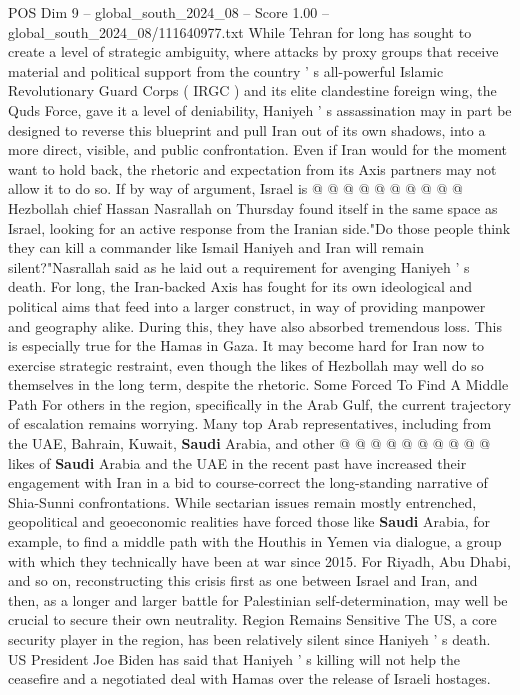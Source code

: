 \begin{textsample}{POS Dim 9 – global\_south\_2024\_08 – Score 1.00 – global\_south\_2024\_08/111640977.txt}
While Tehran for long has sought to create a level of strategic ambiguity, where attacks by proxy groups that receive material and political support from the country ' s all-powerful Islamic Revolutionary Guard Corps ( IRGC ) and its elite clandestine foreign wing, the Quds Force, gave it a level of deniability, Haniyeh ' s assassination may in part be designed to reverse this blueprint and pull Iran out of its own shadows, into a more direct, visible, and public confrontation.
Even if Iran would for the moment want to hold back, the rhetoric and expectation from its Axis partners may not allow it to do so.
If by way of argument, Israel is @ @ @ @ @ @ @ @ @ @ Hezbollah chief Hassan Nasrallah on Thursday found itself in the same space as Israel, looking for an active response from the Iranian side."Do those people think they can kill a commander like Ismail Haniyeh and Iran will remain silent?"Nasrallah said as he laid out a requirement for avenging Haniyeh ' s death.
For long, the Iran-backed Axis has fought for its own ideological and political aims that feed into a larger construct, in way of providing manpower and geography alike.
During this, they have also absorbed tremendous loss.
This is especially true for the Hamas in Gaza.
It may become hard for Iran now to exercise strategic restraint, even though the likes of Hezbollah may well do so themselves in the long term, despite the rhetoric.
Some Forced To Find A Middle Path For others in the region, specifically in the Arab Gulf, the current trajectory of escalation remains worrying.
Many top Arab representatives, including from the UAE, Bahrain, Kuwait, \textbf{Saudi} Arabia, and other @ @ @ @ @ @ @ @ @ @ likes of \textbf{Saudi} Arabia and the UAE in the recent past have increased their engagement with Iran in a bid to course-correct the long-standing narrative of Shia-Sunni confrontations.
While sectarian issues remain mostly entrenched, geopolitical and geoeconomic realities have forced those like \textbf{Saudi} Arabia, for example, to find a middle path with the Houthis in Yemen via dialogue, a group with which they technically have been at war since 2015.
For Riyadh, Abu Dhabi, and so on, reconstructing this crisis first as one between Israel and Iran, and then, as a longer and larger battle for Palestinian self-determination, may well be crucial to secure their own neutrality.
Region Remains Sensitive The US, a core security player in the region, has been relatively silent since Haniyeh ' s death.
US President Joe Biden has said that Haniyeh ' s killing will not help the ceasefire and a negotiated deal with Hamas over the release of Israeli hostages.

\end{textsample}
